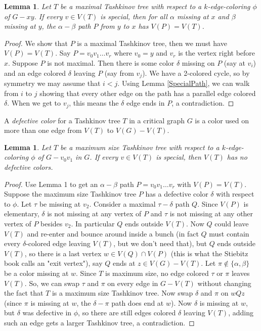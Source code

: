 \documentclass[12pt]{amsart}
\theoremstyle{plain}
\newtheorem{lem}[thm]{Lemma}
\theoremstyle{definition}
\theoremstyle{remark}
\begin{document}
\begin{lem}
Let $T$ be a maximal Tashkinov tree with respect to a $k$-edge-coloring $\phi$
of $G-xy$.  If every $v \in V(T)$ is special, then for all $\alpha$ missing at
$x$ and $\beta$ missing at $y$, the $\alpha-\beta$ path $P$ from $y$ to $x$ has
$V(P) = V(T)$.
\end{lem}
\begin{proof}
We show that $P$ is a maximal Tashkinov tree, then we must have $V(P) = V(T)$.
Say $P = v_0v_1\ldots v_r$ where $v_0 = y$ and $v_r$ is the vertex right before
$x$.  Suppose $P$ is not maximal.  Then there is some color $\delta$ missing on
$P$ (say at $v_i$) and an edge colored $\delta$ leaving $P$ (say from $v_j$). 
We have a 2-colored cycle, so by symmetry we may assume that $i < j$.  Using
Lemma \ref{SpecialPath}, we can walk from $i$ to $j$ showing
that every other edge on the path has a parallel edge colored $\delta$.  When we
get to $v_j$, this means the $\delta$ edge ends in $P$, a contradiction.
\end{proof}

A \emph{defective color} for a
Tashkinov tree $T$  in a critical graph $G$ is a color used on more than one edge
from $V(T)$ to $V(G) - V(T)$.  
\begin{lem}
Let $T$ be a maximum size Tashkinov tree with respect to a $k$-edge-coloring
$\phi$ of $G - v_0v_1$ in $G$.  If every $v \in V(T)$ is special, then $V(T)$
has no defective colors.
\end{lem}
\begin{proof}
Use Lemma 1 to get an $\alpha-\beta$ path $P = v_0v_1\ldots v_r$ with $V(P) =
V(T)$.  Suppose the maximum size Tashkinov tree $P$ has a defective color
$\delta$ with respect to $\phi$. Let $\tau$ be missing at $v_2$. Consider a
maximal $\tau-\delta$ path $Q$.  Since $V(P)$ is elementary, $\delta$ is not
missing at any vertex of $P$ and $\tau$ is not missing at any other vertex of
$P$ besides $v_2$.  In particular $Q$ ends outside $V(T)$.  Now $Q$ could leave
$V(T)$ and re-enter and bounce around inside a bunch (in fact $Q$ must contain
every $\delta$-colored edge leaving $V(T)$, but we don't need that), but $Q$
ends outside $V(T)$, so there is a last vertex $w \in V(Q) \cap V(P)$ (this is
what the Stiebitz book calls an "exit vertex"), say $Q$ ends at $z \in V(G) -
V(T)$.  Let $\pi \notin \{\alpha, \beta\}$ be a color missing at $w$.  Since
$T$ is maximum size, no edge colored $\tau$ or $\pi$ leaves $V(T)$.  So, we can
swap $\tau$ and $\pi$ on every edge in $G - V(T)$ without changing the fact that
$T$ is a maximum size Tashkinov tree.  Now swap $\delta$ and $\pi$ on $wQz$
(since $\pi$ is missing at $w$, the $\delta-\pi$ path does end at $w$).  Now
$\delta$ is missing at $w$, but $\delta$ was defective in $\phi$, so there are
still edges colored $\delta$ leaving $V(T)$, adding such an edge gets a larger
Tashkinov tree, a contradiction.
\end{proof}
\end{document}
